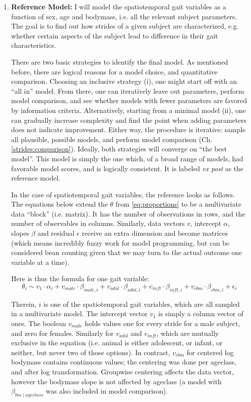 \begin{enumerate}
\item \textbf{Reference Model:}
\label{sec:orge7f3220}
I will model the spatiotemporal gait variables as a function of sex, age and bodymass, i.e. all the relevant subject parameters.
The goal is to find out how strides of a given subject are characterized, e.g. whether certain aspects of the subject lead to difference in their gait characteristics.

There are two basic strategies to identify the final model.
As mentioned before, there are logical reasons for a model choice, and quantitative comparison.
Choosing an inclusive strategy (i), one might start off with an ``all in'' model.
From there, one can iteratively leave out parameters, perform model comparison, and see whether models with fewer parameters are favored by information criteria.
Alternatively, starting from a minimal model (ii), one can gradually increase complexity and find the point when adding parameters does not indicate improvement.
Either way, the procedure is iterative: sample all plausible, possible models, and perform model comparison (Ch. \ref{strides:comparison}).
Ideally, both strategies will converge on ``the best model''.
This model is simply the one which, of a broad range of models, had favorable model scores, and is logically consistent.
It is labeled \emph{ex post} as the reference model.


In the case of spatiotemporal gait variables, the reference looks as follows.
The equations below extend the \(\theta\) from \eqref{eq:proportions} to be a multivariate data ``block'' (i.e. matrix).
It has the number of observations in rows, and the number of observables in columns.
Similarly, data vectors \(v\), intercept \(\alpha\), slopes \(\beta\) and residual \(\epsilon\) receive an extra dimension and become matrices (which means incredibly fuzzy work for model programming, but can be considered bean counting given that we may turn to the actual outcome one variable at a time).

Here is thus the formula for one gait variable:
\begin{equation} \theta_{i} \sim v_{1}\cdot\alpha_{i} + v_{male}\cdot\beta_{male,i} + v_{adol}\cdot\beta_{adol,i} + v_{inft}\cdot\beta_{inft,i} + v_{cbm}\cdot\beta_{cbm,i} + \epsilon_{i} \label{eq:stride} \end{equation}

Therein, \(i\) is one of the spatiotemporal gait variables, which are all sampled in a multivariate model.
The intercept vector \(v_{1}\) is simply a column vector of ones.
The boolean \(v_{male}\) holds values one for every stride for a male subject, and zero for females.
Similarly for \(v_{adol}\) and \(v_{inft}\), which are mutually exclusive in the equation (i.e. animal is either adolescent, or infant, or neither, but never two of those options).
In contrast, \(v_{cbm}\) for centered log bodymass contains continuous values; the centering was done per ageclass, and after log transformation.
Groupwise centering affects the data vector, however the bodymass slope is not affected by ageclass (a model with \(\beta_{bm\mid ageclass}\) was also included in model comparison).



\end{enumerate}

